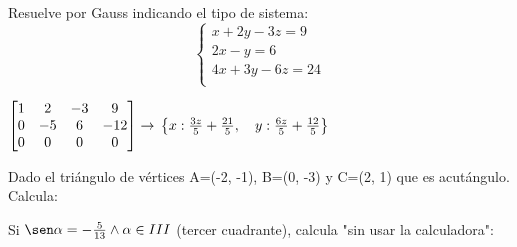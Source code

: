 \documentclass[addpoints,spanish, 12pt,a4paper]{exam}
\begin{document}
\begin{questions}
\begin{multicols}{2}
\begin{parts}
		        \end{parts}
		        \end{multicols}



\question[1] Resuelve por Gauss indicando el tipo de sistema:
 $$\left\{\begin{matrix}x + 2y - 3z = 9\\ 2x - y = 6\\ 4x + 3y - 6z = 24\\ \end{matrix}\right.$$
		 \begin{solution}   $\left[\begin{matrix}1 & 2 & -3 & 9\\0 & -5 & 6 & -12\\0 & 0 & 0 & 0\end{matrix}\right] \rightarrow  \\ \left \{ x : \frac{3 z}{5} + \frac{21}{5}, \quad y : \frac{6 z}{5} + \frac{12}{5}\right \} $   \end{solution}
		 
		 
		         \question[2] Dado el triángulo de vértices A=(-2, -1), B=(0, -3) y  C=(2, 1) que es acutángulo. Calcula:
        \begin{multicols}{1}
        \end{multicols}


        \question[2] Si $\sen\alpha=-\frac{5}{13}\land \alpha \in III$ (tercer cuadrante), calcula "sin usar la calculadora":
        \begin{multicols}{4}
\end{multicols}
\end{questions}
\end{document}
